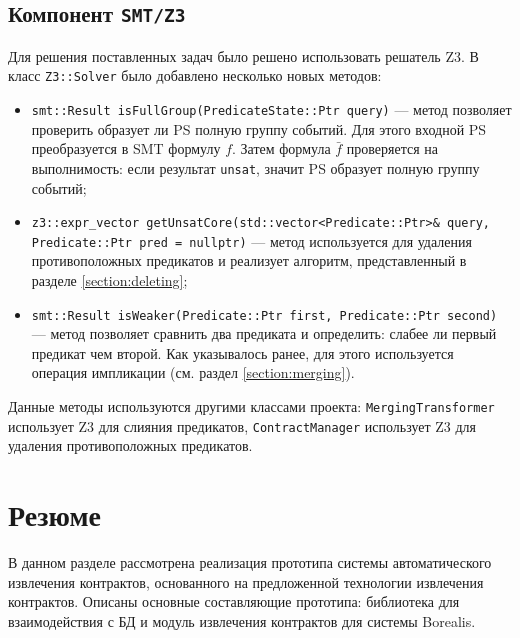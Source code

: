 \subsection{Компонент \texttt{SMT/Z3}}
Для решения поставленных задач было решено использовать решатель Z3. В класс \texttt{Z3::Solver} было добавлено несколько новых методов:
\begin{itemize}
\item \texttt{smt::Result isFullGroup(PredicateState::Ptr query)} --- метод позволяет проверить образует ли PS полную группу событий. Для этого входной PS преобразуется в SMT формулу $f$. Затем формула $\bar{f}$ проверяется на выполнимость: если результат \texttt{unsat}, значит PS образует полную группу событий;
\item \texttt{z3::expr_vector getUnsatCore(std::vector<Predicate::Ptr>\& query, Predicate::Ptr pred = nullptr)} --- метод используется для удаления противоположных предикатов и реализует алгоритм, представленный в разделе \ref{section:deleting};
\item \texttt{smt::Result isWeaker(Predicate::Ptr first, Predicate::Ptr second)} --- метод позволяет сравнить два предиката и определить: слабее ли первый предикат чем второй. Как указывалось ранее, для этого используется операция импликации (см. раздел \ref{section:merging}).
\end{itemize}

Данные методы используются другими классами проекта: \texttt{MergingTransformer} использует Z3 для слияния предикатов, \texttt{ContractManager} использует Z3 для удаления противоположных предикатов.

\section{Резюме}
В данном разделе рассмотрена реализация прототипа системы автоматического извлечения контрактов, основанного на предложенной технологии извлечения контрактов. Описаны основные составляющие прототипа: библиотека для взаимодействия с БД и модуль извлечения контрактов для системы Borealis. 